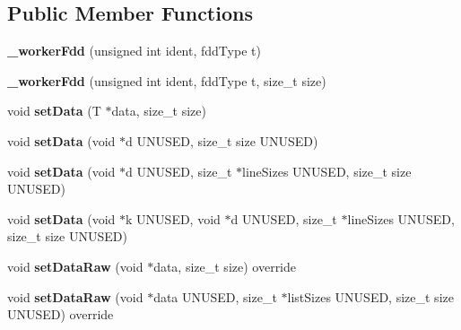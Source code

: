 \subsection*{Public Member Functions}
\begin{DoxyCompactItemize}
\item 
\hypertarget{classfaster_1_1__workerFdd_a9f105bf8697f4f5332ccfb0fa7df8237}{}{\bfseries \+\_\+worker\+Fdd} (unsigned int ident, fdd\+Type t)\label{classfaster_1_1__workerFdd_a9f105bf8697f4f5332ccfb0fa7df8237}

\item 
\hypertarget{classfaster_1_1__workerFdd_ac8d6d1240857a56c57f5d85b6a4b67f5}{}{\bfseries \+\_\+worker\+Fdd} (unsigned int ident, fdd\+Type t, size\+\_\+t size)\label{classfaster_1_1__workerFdd_ac8d6d1240857a56c57f5d85b6a4b67f5}

\item 
\hypertarget{classfaster_1_1__workerFdd_a7031d0b585393f6e5a6ecc5e675a98ff}{}void {\bfseries set\+Data} (T $\ast$data, size\+\_\+t size)\label{classfaster_1_1__workerFdd_a7031d0b585393f6e5a6ecc5e675a98ff}

\item 
\hypertarget{classfaster_1_1__workerFdd_a18e7f4165cbd37d37f5759040b107cce}{}void {\bfseries set\+Data} (void $\ast$d U\+N\+U\+S\+E\+D, size\+\_\+t size U\+N\+U\+S\+E\+D)\label{classfaster_1_1__workerFdd_a18e7f4165cbd37d37f5759040b107cce}

\item 
\hypertarget{classfaster_1_1__workerFdd_ae2a8d9f60a3a0591f23dd5918451cecf}{}void {\bfseries set\+Data} (void $\ast$d U\+N\+U\+S\+E\+D, size\+\_\+t $\ast$line\+Sizes U\+N\+U\+S\+E\+D, size\+\_\+t size U\+N\+U\+S\+E\+D)\label{classfaster_1_1__workerFdd_ae2a8d9f60a3a0591f23dd5918451cecf}

\item 
\hypertarget{classfaster_1_1__workerFdd_a26f3dbf1187402ecd029a3ff1bf5f849}{}void {\bfseries set\+Data} (void $\ast$k U\+N\+U\+S\+E\+D, void $\ast$d U\+N\+U\+S\+E\+D, size\+\_\+t $\ast$line\+Sizes U\+N\+U\+S\+E\+D, size\+\_\+t size U\+N\+U\+S\+E\+D)\label{classfaster_1_1__workerFdd_a26f3dbf1187402ecd029a3ff1bf5f849}

\item 
\hypertarget{classfaster_1_1__workerFdd_a2439827c0e48411f92437a088f55b30f}{}void {\bfseries set\+Data\+Raw} (void $\ast$data, size\+\_\+t size) override\label{classfaster_1_1__workerFdd_a2439827c0e48411f92437a088f55b30f}

\item 
\hypertarget{classfaster_1_1__workerFdd_a236aaba89ce634bce445cfc8e00b0af1}{}void {\bfseries set\+Data\+Raw} (void $\ast$data U\+N\+U\+S\+E\+D, size\+\_\+t $\ast$list\+Sizes U\+N\+U\+S\+E\+D, size\+\_\+t size U\+N\+U\+S\+E\+D) override\label{classfaster_1_1__workerFdd_a236aaba89ce634bce445cfc8e00b0af1}


\end{DoxyCompactItemize}

